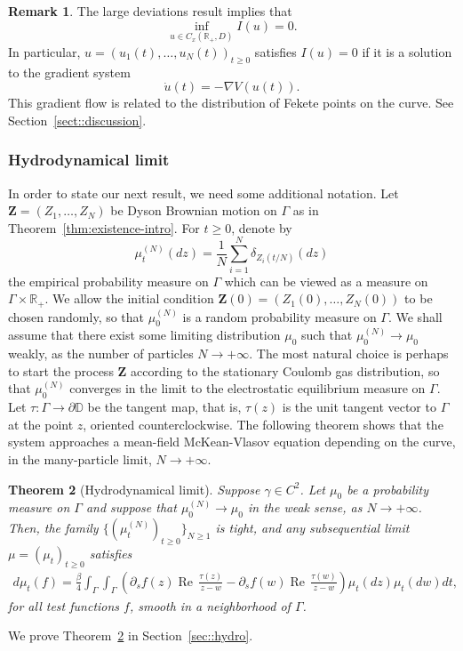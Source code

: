 \documentclass[11pt]{article}
\renewcommand{\Re}{\operatorname{Re}\,}
\numberwithin{equation}{section}
\newtheorem{theorem}{Theorem}[section]
\theoremstyle{definition}
\newtheorem{remark}[theorem]{Remark}
\begin{document}
\begin{remark}
The large deviations result implies that
\[
        \inf\limits_{u\in C_{x}(\mathbb{R}_{+}, D)}I(u) = 0.
\]
In particular, $u = (u_{1}(t),\dots, u_{N}(t))_{t\ge 0}$ satisfies $I(u)=0$ if it is a solution to the gradient system 
\[
        \dot u(t)  =  -\nabla V(u(t)).
\]
This gradient flow is related to the distribution of Fekete points on the curve. See Section~\ref{sect::discussion}.
\end{remark}
\subsubsection*{Hydrodynamical limit}
In order to state our next result, we need some additional notation.  Let ${\boldsymbol{Z}}=(Z_1,\ldots, Z_N)$ be Dyson Brownian motion on $\Gamma$ as in Theorem~\ref{thm:existence-intro}. For $t\ge 0$, denote by 
\[
    \mu_t^{(N)}(dz)=\frac{1}{N}\sum_{i=1}^N\delta_{Z_i(t/N)}(dz)
\]
the empirical probability measure on $\Gamma$ which can be viewed as a measure on $\Gamma \times \mathbb{R}_{+}$. We allow the initial condition $\boldsymbol{Z}(0) = (Z_{1}(0),\dots,Z_{N}(0))$ to be chosen randomly, so that $\mu_0^{(N)}$ is a random probability measure on $\Gamma$. We shall assume that there exist some limiting distribution $\mu_0$ such that $\mu_0^{(N)} \to \mu_0$ weakly, as the number of particles $N\to +\infty$. The most natural choice is perhaps to start the process $\boldsymbol{Z}$ according to the stationary Coulomb gas distribution, so that $\mu^{(N)}_{0}$ converges in the limit to the electrostatic equilibrium measure on $\Gamma$. Let $\tau : \Gamma \to \partial \mathbb{D}$ be the tangent map, that is, $\tau(z)$ is the unit tangent vector to $\Gamma$ at the point $z$, oriented counterclockwise. The following theorem shows that the system approaches a mean-field McKean-Vlasov equation depending on the curve, in the many-particle limit, $N \to +\infty$.
\begin{theorem}[Hydrodynamical limit]\label{thm:hydro}
Suppose $\gamma \in C^2$. Let $\mu_{0}$ be a probability measure on $\Gamma$ and suppose that 
$\mu_{0}^{(N)} \to \mu_{0}$ in the weak sense, as $N\to +\infty$. Then, the family $\{(\mu_{t}^{(N)})_{t\ge 0}\}_{N\ge 1}$ is tight, and any subsequential limit $\mu= (\mu_{t})_{t\ge0}$ satisfies
\begin{align*}%
    d\mu_{t}(f) = \frac{\beta}{4}\int_\Gamma\int_\Gamma\left(\partial_s f(z)\Re\frac{\tau(z)}{z-w}-\partial_s f(w)\Re\frac{\tau(w)}{z-w}\right)\mu_t(dz)\mu_t(dw)dt,
\end{align*}
for all test functions $f$, smooth in a neighborhood of $\Gamma$.
\end{theorem}
\noindent We prove Theorem~\ref{thm:hydro} in Section~\ref{sec::hydro}.
\end{document}
